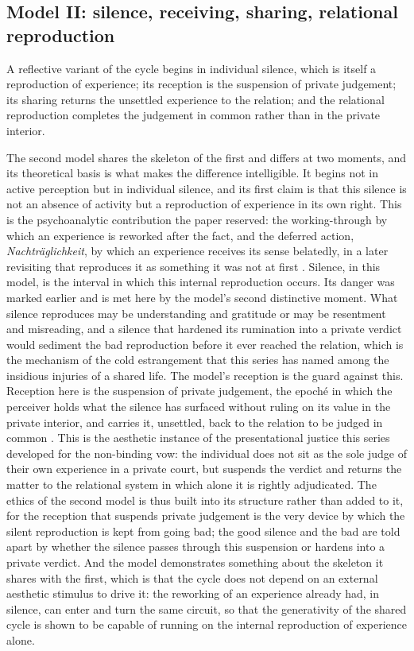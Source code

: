 \subsection{Model II: silence, receiving, sharing, relational reproduction}
\label{p23:sub:typ-model2}

\begin{claim}[Model II]
A reflective variant of the cycle begins in individual silence, which is itself a reproduction of experience; its reception is the suspension of private judgement; its sharing returns the unsettled experience to the relation; and the relational reproduction completes the judgement in common rather than in the private interior.
\end{claim}

The second model shares the skeleton of the first and differs at two moments, and its theoretical basis is what makes the difference intelligible. It begins not in active perception but in individual silence, and its first claim is that this silence is not an absence of activity but a reproduction of experience in its own right. This is the psychoanalytic contribution the paper reserved: the working-through by which an experience is reworked after the fact, and the deferred action, \emph{Nachträglichkeit}, by which an experience receives its sense belatedly, in a later revisiting that reproduces it as something it was not at first \parencite{lacan1978}. Silence, in this model, is the interval in which this internal reproduction occurs. Its danger was marked earlier and is met here by the model's second distinctive moment. What silence reproduces may be understanding and gratitude or may be resentment and misreading, and a silence that hardened its rumination into a private verdict would sediment the bad reproduction before it ever reached the relation, which is the mechanism of the cold estrangement that this series has named among the insidious injuries of a shared life. The model's reception is the guard against this. Reception here is the suspension of private judgement, the epoch\'e in which the perceiver holds what the silence has surfaced without ruling on its value in the private interior, and carries it, unsettled, back to the relation to be judged in common \parencite{husserl2001}. This is the aesthetic instance of the presentational justice this series developed for the non-binding vow: the individual does not sit as the sole judge of their own experience in a private court, but suspends the verdict and returns the matter to the relational system in which alone it is rightly adjudicated. The ethics of the second model is thus built into its structure rather than added to it, for the reception that suspends private judgement is the very device by which the silent reproduction is kept from going bad; the good silence and the bad are told apart by whether the silence passes through this suspension or hardens into a private verdict. And the model demonstrates something about the skeleton it shares with the first, which is that the cycle does not depend on an external aesthetic stimulus to drive it: the reworking of an experience already had, in silence, can enter and turn the same circuit, so that the generativity of the shared cycle is shown to be capable of running on the internal reproduction of experience alone.

